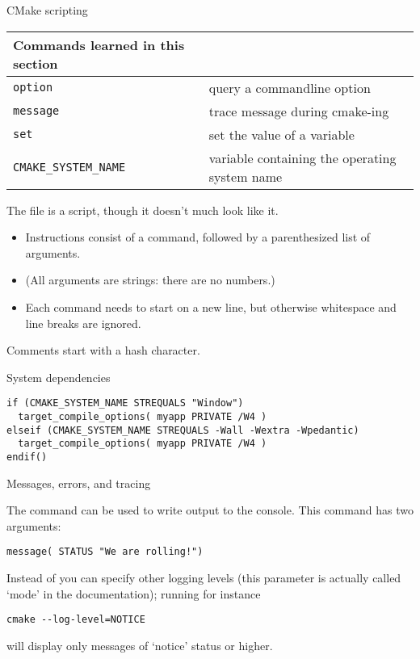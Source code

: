  {CMake scripting}
\label{sec:cmake-script}

\begin{tabular}{lp{3in}}
  \toprule
  Commands learned in this section\\
  \midrule
  \lstinline+option+&query a commandline option\\
  \lstinline+message+&trace message during cmake-ing\\
  \lstinline+set+&set the value of a variable\\
  \lstinline+CMAKE_SYSTEM_NAME+&variable containing the operating system name\\
  \bottomrule
\end{tabular}

The  file is a script,
though it doesn't much look like it.
\begin{itemize}
\item
  Instructions consist of a command, followed by a parenthesized
  list of arguments.
\item
  (All arguments are strings: there are no numbers.)
\item
  Each command needs to start on a new line, but otherwise
  whitespace and line breaks are ignored.
\end{itemize}

Comments start with a hash character.

 {System dependencies}

\begin{lstlisting}
if (CMAKE_SYSTEM_NAME STREQUALS "Window")
  target_compile_options( myapp PRIVATE /W4 )
elseif (CMAKE_SYSTEM_NAME STREQUALS -Wall -Wextra -Wpedantic)
  target_compile_options( myapp PRIVATE /W4 )
endif()
\end{lstlisting}

 {Messages, errors, and tracing}

The  command can be used to write output
to the console. This command has two arguments:
\begin{lstlisting}
message( STATUS "We are rolling!")
\end{lstlisting}
Instead of  you can specify other logging levels
(this parameter is actually called `mode' in the documentation);
running for instance
\begin{verbatim}
cmake --log-level=NOTICE
\end{verbatim}
will display only messages of `notice' status or higher.

